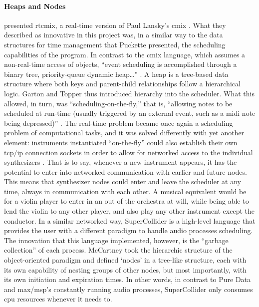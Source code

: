 \documentclass[
]{book}
\begin{document}
\paragraph{Heaps and Nodes}
\textcite{DBLP:conf/icmc/GartonT97} presented \gls{rtcmix}, a real-time version of Paul Lansky's \gls{cmix} \parencite{DBLP:conf/icmc/Lansky90}. What they described as innovative in this project was, in a similar way to the data structures for time management that Puckette presented, the scheduling capabilities of the program. In contrast to the \gls{cmix} language, which assumes a non-real-time access of objects, ``event scheduling is accomplished through a binary tree, priority-queue dynamic heap\dots '' \parencite{DBLP:conf/icmc/GartonT97}. A heap is a tree-based data structure where both keys and parent-child relationships follow a hierarchical logic. Garton and Topper thus introduced hierarchy into the scheduler. What this allowed, in turn, was ``scheduling-on-the-fly,'' that is, ``allowing notes to be scheduled at run-time (usually triggered by an external event, such as a \gls{midi} note being depressed)'' \parencite{DBLP:conf/icmc/GartonT97}. The real-time problem became once again a scheduling problem of computational tasks, and it was solved differently with yet another element: instruments instantiated ``on-the-fly'' could also establish their own \gls{tcp/ip} connection sockets in order to allow for networked access to the individual synthesizers \parencite{DBLP:conf/icmc/GartonT97}. That is to say, whenever a new instrument appears, it has the potential to enter into networked communication with earlier and future nodes. This means that synthesizer nodes could enter and leave the scheduler at any time, always in communication with each other. A musical equivalent would be for a violin player to enter in an out of the orchestra at will, while being able to lend the violin to any other player, and also play any other instrument except the conductor. In a similar networked way, SuperCollider \parencites{DBLP:conf/icmc/McCartney96}{DBLP:conf/icmc/McCartney98} is a high-level language that provides the user with a different paradigm to handle audio processes scheduling. The innovation that this language implemented, however, is the ``garbage collection'' of each process. McCartney took the hierarchic structure of the object-oriented paradigm and defined `nodes' in a tree-like structure, each with its own capability of nesting groups of other nodes, but most importantly, with its own initiation and expiration times. In other words, in contrast to Pure Data and \gls{max/msp}'s constantly running audio processes, SuperCollider only consumes \gls{cpu} resources whenever it needs to.
\end{document}
